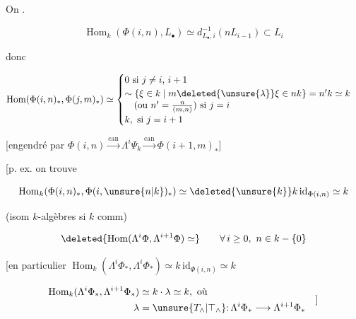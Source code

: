 
On  .

\[
\operatorname{Hom}_k(\Phi(i,n),L_{\bullet})\simeq d_{L_{\bullet},i}^{-1}(nL_{i-1})\subset L_i
\]


donc 

\[
\operatorname{Hom}(\Phi(i,n)_{\ast},\Phi(j,m)_{\ast})\simeq
\begin{cases}
0\ \text{si } j\ne i,\,i+1\\
\sim\{\xi\in k\mid m\deleted{\unsure{\lambda}}\xi\in nk\}=n'k\simeq k\\[-2pt]
\quad(\text{ou } n'=\frac{n}{(m,n)})\ \text{si }j=i\\
k,\ \text{si }j=i+1
\end{cases}
\]

[engendré par  $\Phi(i,n)\xrightarrow{\mathrm{can}}\Lambda^i\Psi_k\xrightarrow{\mathrm{can}}\Phi(i+1,m)_{\ast}$]

[p. ex. on trouve

\[
\operatorname{Hom}_k(\Phi(i,n)_{\ast},\Phi(i,\unsure{n|k})_{\ast})\simeq\deleted{\unsure{k}}k\,\mathrm{id}_{\Phi(i,n)}\simeq k
\]

(isom   $k$-algèbres si $k$ comm)

\[
\deleted{\operatorname{Hom}(\Lambda^{i}\Phi,\Lambda^{i+1}\Phi)\simeq}\qquad \forall\,i\geq0,\ n\in k-\{0\}
\]

[en particulier $\operatorname{Hom}_k(\Lambda^i\Phi_{\ast},\Lambda^i\Phi_{\ast})\simeq k\,\mathrm{id}_{\Phi(i,n)}\simeq k$ \unsure{]} 

\[
\begin{aligned}
\operatorname{Hom}_k(\Lambda^i\Phi_{\ast},\Lambda^{i+1}\Phi_{\ast})&\simeq k\cdot\lambda\simeq k,\ \text{où}\\
\lambda&=\unsure{T_{\wedge}|\top_{\wedge}}\mathpunct{:}\Lambda^i\Phi_{\ast}\longrightarrow\Lambda^{i+1}\Phi_{\ast}
\end{aligned}\quad\text{]}
\]

